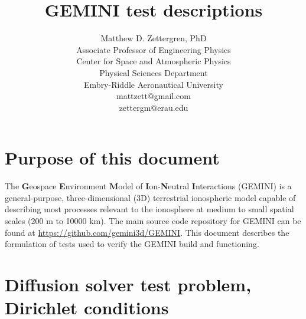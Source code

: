 \documentclass[11pt,letterpaper]{article}
\begin{document}
\setlength{\parindent}{0mm}
\setlength{\parskip}{0.4cm}




\title{\textbf{GEMINI} test descriptions}
\author{Matthew D. Zettergren, PhD\\ Associate Professor of Engineering Physics\\ Center for Space and Atmospheric Physics\\ Physical Sciences Department \\Embry-Riddle Aeronautical University\\mattzett@gmail.com\\zettergm@erau.edu}
\maketitle

\tableofcontents

\pagebreak


\section{Purpose of this document}

The \textbf{G}eospace \textbf{E}nvironment \textbf{M}odel of \textbf{I}on-\textbf{N}eutral \textbf{I}nteractions (GEMINI) is a general-purpose, three-dimensional (3D) terrestrial ionospheric model capable of describing most processes relevant to the ionosphere at medium to small spatial scales (200 m to 10000 km).  The main source code repository for GEMINI can be found at \url{https://github.com/gemini3d/GEMINI}.  This document describes the formulation of tests used to verify the GEMINI build and functioning.  


\section{Diffusion solver test problem, Dirichlet conditions}
\end{document}
